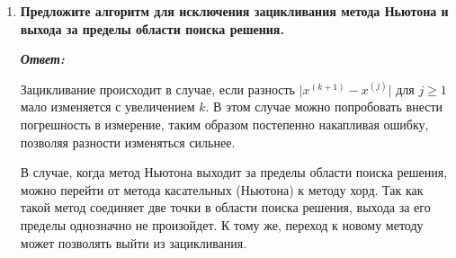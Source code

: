 \documentclass[12pt, a4paper]{article}
\newcommand{\abs}[1]{\lvert #1 \rvert}
\begin{document}
\begin{enumerate}
		\item \textbf{Предложите алгоритм для исключения зацикливания метода Ньютона и выхода за пределы области поиска решения.}
		\vspace*{0.2cm}
		
		\textit{\textbf{Ответ:}}

		Зацикливание происходит в случае, если разность $\abs{x^{(k+1)} - x^{(j)}}$ для $j \geq 1$ мало изменяется с увеличением $k$. В этом случае можно попробовать внести погрешность в измерение, таким образом постепенно накапливая ошибку, позволяя разности изменяться сильнее.

		В случае, когда метод Ньютона выходит за пределы области поиска решения, можно перейти от метода касательных (Ньютона) к методу хорд. Так как такой метод соединяет две точки в области поиска решения, выхода за его пределы однозначно не произойдет. К тому же, переход к новому методу может позволять выйти из зацикливания.
	\end{enumerate}
	
	

	
	
\end{document}
